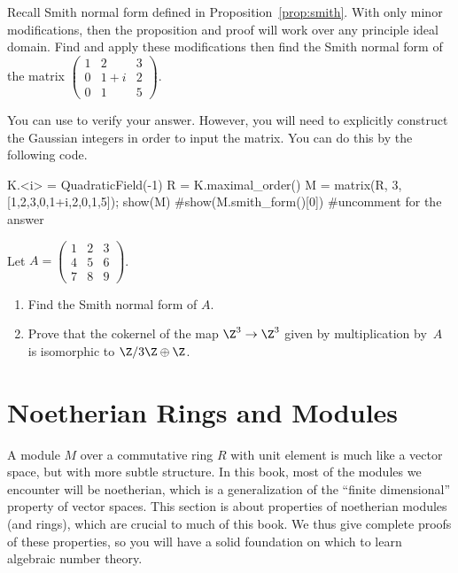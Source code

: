 \begin{exercise}
	Recall Smith normal form defined in Proposition~\ref{prop:smith}. With only minor modifications, then the proposition and proof will work over any principle ideal domain. Find and apply these modifications then find the Smith normal form of the matrix $\begin{pmatrix} 1 & 2 & 3 \\ 0 & 1+i & 2 \\ 0 & 1 & 5 \end{pmatrix}$.
	
	\begin{hint}
		You can use \sage{} to verify your answer. However, you will need to explicitly construct the Gaussian integers in order to input the matrix. You can do this by the following code.
	\end{hint}
	\begin{sagecode}
	\begin{sagecell}
K.<i> = QuadraticField(-1)
R = K.maximal_order()
M = matrix(R, 3, [1,2,3,0,1+i,2,0,1,5]); show(M)
#show(M.smith_form()[0]) #uncomment for the answer
	\end{sagecell}
	\end{sagecode}
\end{exercise}

\begin{exercise}
	Let $A=\left(
	        \begin{matrix}1&2&3\\4&5&6\\7&8&9
	        \end{matrix}\right)$.
	\begin{enumerate}
	\item Find the Smith normal form of $A$.
	\item Prove that
	the cokernel of the map $\Z^3\to \Z^3$ given by multiplication by~$A$
	is isomorphic to $\Z/3\Z \oplus \Z$.
	\end{enumerate}
\end{exercise}

\section{Noetherian Rings and Modules}\label{sec:noetherian}

A module $M$ over a commutative ring $R$ with unit element is much
like a vector space, but with more subtle structure.  In this book,
most of the modules we encounter will be noetherian, which is a
generalization of the ``finite dimensional'' property of vector
spaces.  This section is about properties of noetherian modules (and
rings), which are crucial to much of this book.  We thus
give complete proofs of these properties, so you will have a solid
foundation on which to learn algebraic number theory.

